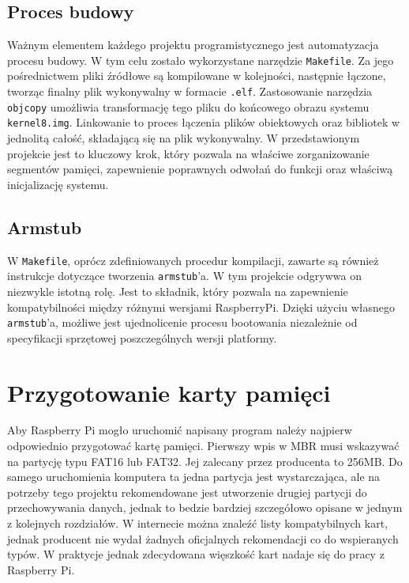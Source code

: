 \documentclass[shortabstract]{iithesis}
\begin{document}
\subsection{Proces budowy}
Ważnym elementem każdego projektu programistycznego jest automatyzacja procesu budowy. W tym celu zostało wykorzystane narzędzie \texttt{Makefile}. Za jego pośrednictwem pliki źródłowe są kompilowane w kolejności, następnie łączone, tworząc finalny plik wykonywalny w formacie \texttt{.elf}. Zastosowanie narzędzia \texttt{objcopy} umożliwia transformację tego pliku do końcowego obrazu systemu \texttt{kernel8.img}.
Linkowanie to proces łączenia plików obiektowych oraz bibliotek w jednolitą całość, składającą się na plik wykonywalny. W przedstawionym projekcie jest to kluczowy krok, który pozwala na właściwe zorganizowanie segmentów pamięci, zapewnienie poprawnych odwołań do funkcji oraz właściwą inicjalizację systemu.
\subsection{Armstub}
W \texttt{Makefile}, oprócz zdefiniowanych procedur kompilacji, zawarte są również instrukcje dotyczące tworzenia \texttt{armstub}'a. W tym projekcie odgrywwa on niezwykle istotną rolę. Jest to składnik, który pozwala na zapewnienie kompatybilności między różnymi wersjami RaspberryPi. Dzięki użyciu własnego \texttt{armstub}'a, możliwe jest ujednolicenie procesu bootowania niezależnie od specyfikacji sprzętowej poszczególnych wersji platformy.

\section{Przygotowanie karty pamięci}
Aby Raspberry Pi mogło uruchomić napisany program należy najpierw odpowiednio przygotować kartę pamięci. Pierwszy wpis w MBR musi wskazywać na partycję typu FAT16 lub FAT32. Jej zalecany przez producenta to 256MB. Do samego uruchomienia komputera ta jedna partycja jest wystarczająca, ale na potrzeby tego projektu rekomendowane jest utworzenie drugiej partycji do przechowywania danych, jednak to bedzie bardziej szczegółowo opisane w jednym z kolejnych rozdziałów. W internecie można znaleźć listy kompatybilnych kart, jednak producent nie wydał żadnych oficjalnych rekomendacji co do wspieranych typów. W praktycje jednak zdecydowana więszkość kart nadaje się do pracy z Raspberry Pi.
\end{document}
